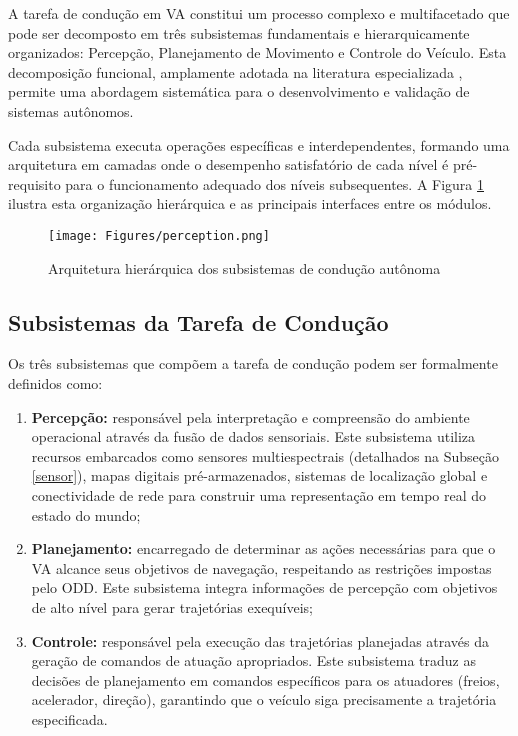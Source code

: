 A tarefa de condução em VA constitui um processo complexo e multifacetado que pode ser decomposto em três subsistemas fundamentais e hierarquicamente organizados: Percepção, Planejamento de Movimento e Controle do Veículo. Esta decomposição funcional, amplamente adotada na literatura especializada , permite uma abordagem sistemática para o desenvolvimento e validação de sistemas autônomos.

Cada subsistema executa operações específicas e interdependentes, formando uma arquitetura em camadas onde o desempenho satisfatório de cada nível é pré-requisito para o funcionamento adequado dos níveis subsequentes. A Figura \ref{perception_pt} ilustra esta organização hierárquica e as principais interfaces entre os módulos.

\begin{figure}[H]
\centering
\texttt{[image: Figures/perception.png]}
\caption{Arquitetura hierárquica dos subsistemas de condução autônoma \cite[p. ~4]{sensors-yet}}
\label{perception_pt}
\end{figure}

\subsection{Subsistemas da Tarefa de Condução}

Os três subsistemas que compõem a tarefa de condução podem ser formalmente definidos como:

\begin{enumerate}
\item \textbf{Percepção:} responsável pela interpretação e compreensão do ambiente operacional através da fusão de dados sensoriais. Este subsistema utiliza recursos embarcados como sensores multiespectrais (detalhados na Subseção \ref{sensor}), mapas digitais pré-armazenados, sistemas de localização global e conectividade de rede para construir uma representação em tempo real do estado do mundo;


\item \textbf{Planejamento:} encarregado de determinar as ações necessárias para que o VA alcance seus objetivos de navegação, respeitando as restrições impostas pelo ODD. Este subsistema integra informações de percepção com objetivos de alto nível para gerar trajetórias exequíveis;

\item \textbf{Controle:} responsável pela execução das trajetórias planejadas através da geração de comandos de atuação apropriados. Este subsistema traduz as decisões de planejamento em comandos específicos para os atuadores (freios, acelerador, direção), garantindo que o veículo siga precisamente a trajetória especificada.
\end{enumerate}

